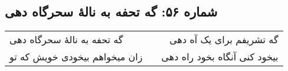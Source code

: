 \begin{center}
\section*{شماره ۵۶: گه تحفه به نالۀ سحرگاه دهی}
\label{sec:056}
\begin{longtable}{l p{0.5cm} r}
گه تحفه به نالهٔ سحرگاه دهی
&&
گه تشریفم برای یک آه دهی
\\
زان میخواهم بیخودی خویش که تو
&&
بیخود کنی آنگاه بخود راه دهی
\\
\end{longtable}
\end{center}
